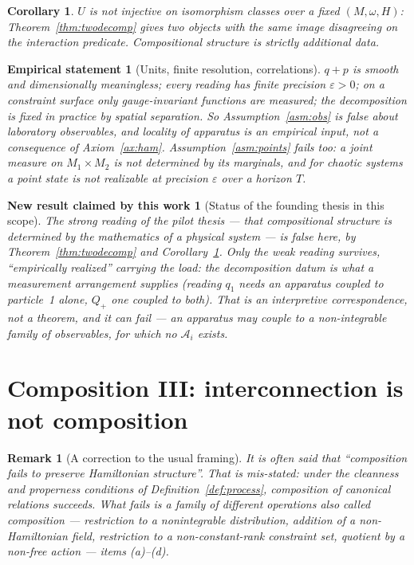 \documentclass[12pt,a4paper]{article}
\theoremstyle{definition}
\theoremstyle{plain}
\newtheorem{corollary}[definition]{Corollary}
\theoremstyle{commentary}
\newtheorem{empirical}[definition]{Empirical statement}
\newtheorem{newresult}[definition]{New result claimed by this work}
\newtheorem{remark}[definition]{Remark}
\newcommand{\eps}{\varepsilon}
\newcommand{\Ac}{\mathcal{A}}
\begin{document}
\begin{corollary}\label{cor:forget}
$U$ is not injective on isomorphism classes over a fixed $(M,\omega,H)$:
Theorem~\ref{thm:twodecomp} gives two objects with the same image disagreeing on the
interaction predicate. Compositional structure is \emph{strictly additional data}.
\end{corollary}

\begin{empirical}[Units, finite resolution, correlations]\label{emp:units}
$q+p$ is smooth and dimensionally meaningless; every reading has finite precision $\eps>0$;
on a constraint surface only gauge-invariant functions are measured; the decomposition is
fixed in practice by spatial separation. So Assumption~\ref{asm:obs} is false about laboratory
observables, and locality of apparatus is an empirical input, not a consequence of
Axiom~\ref{ax:ham}. Assumption~\ref{asm:points} fails too: a joint measure on
$M_1\times M_2$ is \emph{not} determined by its marginals, and for chaotic systems a point
state is not realizable at precision $\eps$ over a horizon $T$.
\end{empirical}

\begin{newresult}[Status of the founding thesis in this scope]\label{new:thesis}
The strong reading of the pilot thesis --- that compositional structure is determined by the
mathematics of a physical system --- is \emph{false} here, by Theorem~\ref{thm:twodecomp} and
Corollary~\ref{cor:forget}. Only the weak reading survives, ``empirically realized'' carrying
the load: the decomposition datum is what a measurement arrangement supplies (reading $q_1$
needs an apparatus coupled to particle~1 alone, $Q_+$ one coupled to both). That is an
interpretive correspondence, not a theorem, and it can fail --- an apparatus may couple to a
non-integrable family of observables, for which no $\Ac_i$ exists.
\end{newresult}

\section{Composition III: interconnection is not composition}\label{sec:interconnection}

\begin{remark}[A correction to the usual framing]\label{rem:notcomposition}
It is often said that ``composition fails to preserve Hamiltonian structure''. That is
mis-stated: under the cleanness and properness conditions of Definition~\ref{def:process},
composition of canonical relations succeeds. What fails is a family of \emph{different}
operations also called composition --- restriction to a nonintegrable distribution, addition
of a non-Hamiltonian field, restriction to a non-constant-rank constraint set, quotient by a
non-free action --- items (a)--(d).
\end{remark}
\end{document}

